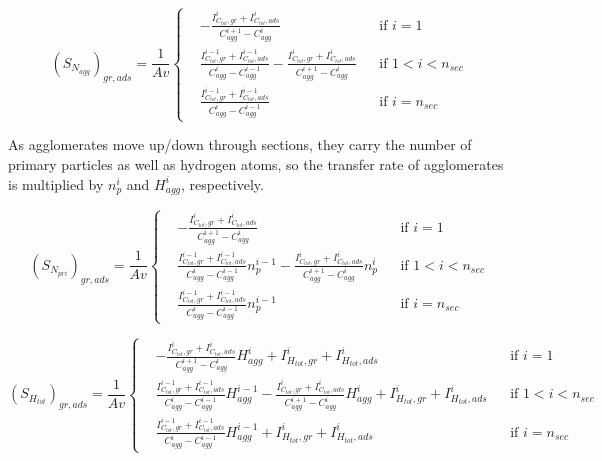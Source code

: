 \begin{equation}
	\left(S_{N_{agg}}\right)_{gr, ads}=
	\frac{1}{Av}
	\left\{
	\begin{aligned}
		&-\frac{I^i_{C_{tot},gr}+I^i_{C_{tot},ads}}{C^{i+1}_{agg}-C^{i}_{agg}}
		&&
		\text{if } i = 1
		\\
		&\frac{I^{i-1}_{C_{tot},gr}+I^{i-1}_{C_{tot},ads}}{C^{i}_{agg}-C^{i-1}_{agg}}
		-\frac{I^{i}_{C_{tot},gr}+I^{i}_{C_{tot},ads}}{C^{i+1}_{agg}-C^{i}_{agg}}
		&&
		\text{if } 1 < i < n_{sec}
		\\
		&\frac{I^{i-1}_{C_{tot},gr}+I^{i-1}_{C_{tot},ads}}{C^{i}_{agg}-C^{i-1}_{agg}}
		&&\text{if } i=n_{sec}
	\end{aligned}
	\right.
	\label{eqn:S_Nagg_gradssect}
\end{equation}

As agglomerates move up/down through sections, they carry the number of primary particles as well as hydrogen atoms, so the transfer rate of agglomerates is multiplied by ${n^i_p}$ and ${H^i_{agg}}$, respectively. 

\begin{equation}
	\left(S_{N_{pri}}\right)_{gr, ads}=
	\frac{1}{Av}
	\left\{
	\begin{aligned}
		&-\frac{I^i_{C_{tot},gr}+I^i_{C_{tot},ads}}{C^{i+1}_{agg}-C^{i}_{agg}}
		&&
		\text{if } i = 1
		\\
		&\frac{I^{i-1}_{C_{tot},gr}+I^{i-1}_{C_{tot},ads}}{C^{i}_{agg}-C^{i-1}_{agg}}n^{i-1}_p
		-\frac{I^{i}_{C_{tot},gr}+I^{i}_{C_{tot},ads}}{C^{i+1}_{agg}-C^{i}_{agg}}n^{i}_p
		&&
		\text{if } 1 < i < n_{sec}
		\\
		&\frac{I^{i-1}_{C_{tot},gr}+I^{i-1}_{C_{tot},ads}}{C^{i}_{agg}-C^{i-1}_{agg}}n^{i-1}_p
		&&\text{if } i=n_{sec}
	\end{aligned}
	\right.
	\label{eqn:S_Npri_gradssect}
\end{equation}

\begin{equation}
	\left(S_{H_{tot}}\right)_{gr, ads}=
	\frac{1}{Av}
	\left\{
	\begin{aligned}
		&-\frac{I^i_{C_{tot},gr}+I^i_{C_{tot},ads}}{C^{i+1}_{agg}-C^{i}_{agg}}H^{i}_{agg} 
		+ I^{i}_{H_{tot}, gr} + I^{i}_{H_{tot}, ads}
		&&
		\text{if } i = 1
		\\
		&\frac{I^{i-1}_{C_{tot},gr}+I^{i-1}_{C_{tot},ads}}{C^{i}_{agg}-C^{i-1}_{agg}}H^{i-1}_{agg}
		-\frac{I^{i}_{C_{tot},gr}+I^{i}_{C_{tot},ads}}{C^{i+1}_{agg}-C^{i}_{agg}}H^{i}_{agg}
		+ I^{i}_{H_{tot}, gr} + I^{i}_{H_{tot}, ads}
		&&
		\text{if } 1 < i < n_{sec}
		\\
		&\frac{I^{i-1}_{C_{tot},gr}+I^{i-1}_{C_{tot},ads}}{C^{i}_{agg}-C^{i-1}_{agg}}H^{i-1}_{agg}
		+ I^{i}_{H_{tot}, gr} + I^{i}_{H_{tot}, ads}
		&&\text{if } i=n_{sec}
	\end{aligned}
	\right.
	\label{eqn:S_Htot_gradssect}
\end{equation}

